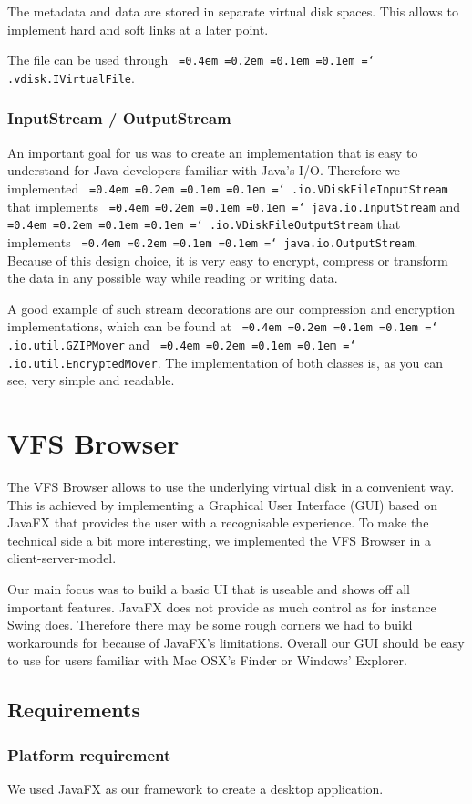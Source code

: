 \documentclass[a4paper,12pt]{article}
\newcommand*\justify{%
  \fontdimen2\font=0.4em%
  \fontdimen3\font=0.2em%
  \fontdimen4\font=0.1em%
  \fontdimen7\font=0.1em%
  \hyphenchar\font=`\-%
}
\newcommand{\mono}[1]{\texttt{\justify #1}}
\begin{document}
The metadata and data are stored in separate virtual disk spaces. This allows to implement hard and soft links at a later point.

The file can be used through \mono{.vdisk.IVirtualFile}.

\subsubsection{InputStream / OutputStream}
An important goal for us was to create an implementation that is easy to understand for Java developers familiar with Java's I/O. Therefore we implemented \mono{.io.VDiskFileInputStream} that implements \mono{java.io.InputStream} and \mono{.io.VDiskFileOutputStream} that implements \mono{java.io.OutputStream}. Because of this design choice, it is very easy to encrypt, compress or transform the data in any possible way while reading or writing data.

A good example of such stream decorations are our compression and encryption implementations, which can be found at \mono{.io.util.GZIPMover} and \mono{.io.util.EncryptedMover}. The implementation of both classes is, as you can see, very simple and readable.

\newpage



\section{VFS Browser}
The VFS Browser allows to use the underlying virtual disk in a convenient way. This is achieved by implementing a Graphical User Interface (GUI) based on JavaFX that provides the user with a recognisable experience. To make the technical side a bit more interesting, we implemented the VFS Browser in a client-server-model.

Our main focus was to build a basic UI that is useable and shows off all important features. JavaFX does not provide as much control as for instance Swing does. Therefore there may be some rough corners we had to build workarounds for because of JavaFX's limitations. Overall our GUI should be easy to use for users familiar with Mac OSX's Finder or Windows' Explorer.

\subsection{Requirements}
\subsubsection{Platform requirement}
We used JavaFX as our framework to create a desktop application.
\end{document}
